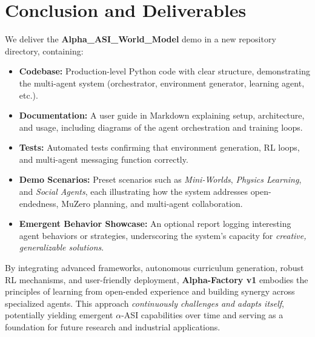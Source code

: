 \documentclass{article}
\begin{document}
\section{Conclusion and Deliverables}
We deliver the \textbf{Alpha\_ASI\_World\_Model} demo in a new repository directory, containing:

\begin{itemize}
  \item \textbf{Codebase:} Production-level Python code with clear structure, demonstrating the multi-agent system (orchestrator, environment generator, learning agent, etc.).
  \item \textbf{Documentation:} A user guide in Markdown explaining setup, architecture, and usage, including diagrams of the agent orchestration and training loops.
  \item \textbf{Tests:} Automated tests confirming that environment generation, RL loops, and multi-agent messaging function correctly.
  \item \textbf{Demo Scenarios:} Preset scenarios such as \emph{Mini-Worlds}, \emph{Physics Learning}, and \emph{Social Agents}, each illustrating how the system addresses open-endedness, MuZero planning, and multi-agent collaboration.
  \item \textbf{Emergent Behavior Showcase:} An optional report logging interesting agent behaviors or strategies, underscoring the system’s capacity for \emph{creative, generalizable solutions}.
\end{itemize}

By integrating advanced frameworks, autonomous curriculum generation, robust RL mechanisms, and user-friendly deployment, \textbf{Alpha-Factory v1} embodies the principles of learning from open-ended experience and building synergy across specialized agents. This approach \emph{continuously challenges and adapts itself}, potentially yielding emergent \(\alpha\)-ASI capabilities over time and serving as a foundation for future research and industrial applications.
\end{document}
